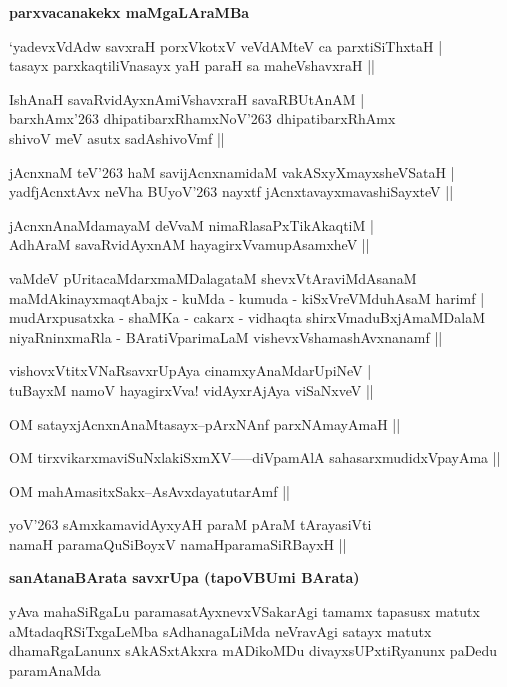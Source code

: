 {\bigskip
\noindent
{\large\bf parxvacanakekx maMgaLAraMBa}}\label{page102}
\begin{description}
{\bf
\item [1)] `yadevxVdAdw savxraH porxVkotxV veVdAMteV ca parxtiSiThxtaH |\\\label{102} tasayx parxkaqtiliVnasayx yaH paraH sa maheVshavxraH ||
\item [2)] IshAnaH savaRvidAyxnAmiVshavxraH savaRBUtAnAM |\\ barxhAmx\char'263 dhipatibarxRhamxNoV\char'263 dhipatibarxRhAmx\\ shivoV meV asutx sadAshivoVmf ||
\item [3)] jAcnxnaM teV\char'263 haM savijAcnxnamidaM\label{72} vakASxyXmayxsheVSataH |\\ yadfjAcnxtAvx neVha BUyoV\char'263 nayxtf jAcnxtavayxmavashiSayxteV ||
\item [4)] jAcnxnAnaMdamayaM deVvaM nimaRlasaPxTikAkaqtiM |\\ AdhAraM savaRvidAyxnAM hayagirxVvamupAsamxheV ||\label{102}
\item [5)] vaMdeV pUritacaMdarxmaMDalagataM shevxVtAraviMdAsanaM\\ maMdAkinayxmaqtAbajx - kuMda - kumuda - kiSxVreVMduhAsaM harimf |\\ mudArxpusatxka - shaMKa - cakarx - vidhaqta shirxVmaduBxjAmaMDalaM\\ niyaRninxmaRla - BAratiVparimaLaM vishevxVshamashAvxnanamf ||
\item [6)] vishovxVtitxVNaRsavxrUpAya cinamxyAnaMdarUpiNeV |\\\label{102} tuBayxM namoV hayagirxVva! vidAyxrAjAya viSaNxveV ||
\item [7)] OM satayxjAcnxnAnaMtasayx--pArxNAnf parxNAmayAmaH ||\label{81}\label{103}
\item [8)] OM tirxvikarxmaviSuNxlakiSxmXV-----diVpamAlA sahasarxmudidxVpayAma ||\label{103}
\item [9)] OM mahAmasitxSakx--AsAvxdayatutarAmf ||\label{103}
\item [10)] yoV\char'263 sAmxkamavidAyxyAH paraM pAraM tArayasiVti\\\label{103} namaH paramaQuSiBoyxV namaHparamaSiRBayxH ||}
\end{description}

\medskip

{\noindent
{\large\bf sanAtanaBArata savxrUpa (tapoVBUmi BArata)}}\label{page103}
\medskip

\noindent
yAva mahaSiRgaLu paramasatAyxnevxVSakarAgi tamamx tapasusx matutx aMtadaqRSiTxgaLeMba sAdhanagaLiMda neVra\-vAgi satayx matutx dhamaRgaLanunx sAkASxtAkxra mADikoMDu divayx\-sUPxtiRyanunx paDedu paramAnaMda

